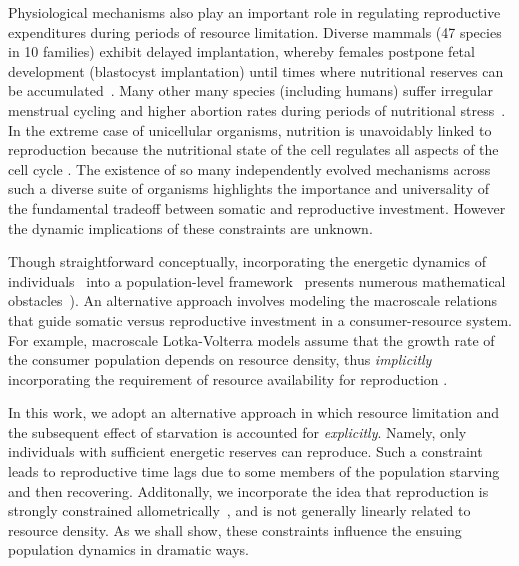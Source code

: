 \documentclass{pnastwo}
\begin{document}
\begin{article}
Physiological mechanisms also play an important role in regulating
reproductive expenditures during periods of resource limitation.  Diverse
mammals (47 species in 10 families) exhibit delayed implantation, whereby
females postpone fetal development (blastocyst implantation) until times
where nutritional reserves can be
accumulated~\cite{Mead:1989dt,Sandell:1990kw}.  Many other many species
(including humans) suffer irregular menstrual cycling and higher abortion
rates during periods of nutritional stress~\cite{Bulik:1999eo,Trites:2003cc}.
In the extreme case of unicellular organisms, nutrition is unavoidably linked
to reproduction because the nutritional state of the cell regulates all
aspects of the cell cycle \cite{Glazier:2009hq}.  The existence of so many
independently evolved mechanisms across such a diverse suite of organisms
highlights the importance and universality of the fundamental tradeoff
between somatic and reproductive investment.  However the dynamic
implications of these constraints are unknown.

Though straightforward conceptually, incorporating the energetic dynamics of
individuals~\cite{Kooi2000} into a population-level
framework~\cite{Kooi2000,Sousa:2010ez} presents numerous mathematical
obstacles~\cite{Diekmann:2010da}).  An alternative approach involves modeling
the macroscale relations that guide somatic versus reproductive investment in
a consumer-resource system.  For example, macroscale Lotka-Volterra models
assume that the growth rate of the consumer population depends on resource
density, thus \emph{implicitly} incorporating the requirement of resource
availability for reproduction \cite{murdoch:2003}.

In this work, we adopt an alternative approach in which resource limitation
and the subsequent effect of starvation is accounted for \emph{explicitly}.
Namely, only individuals with sufficient energetic reserves can reproduce.
Such a constraint leads to reproductive time lags due to some members of the
population starving and then recovering.  Additonally, we incorporate the
idea that reproduction is strongly constrained
allometrically~\cite{Kempes:2012hy}, and is not generally linearly related to
resource density.  As we shall show, these constraints influence the ensuing
population dynamics in dramatic ways.
\\



\end{article}
\end{document}
